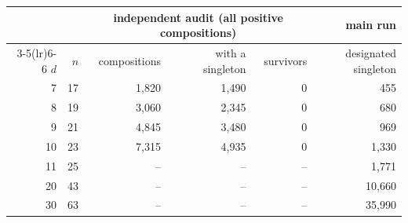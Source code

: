 \begin{tabular}{rrrrrr}
\toprule
 & & \multicolumn{3}{c}{independent audit (all positive compositions)} & main run \\
\cmidrule(lr){3-5}\cmidrule(lr){6-6}
$d$ & $n$ & compositions & with a singleton & survivors & designated singleton \\
\midrule
7 & 17 & 1{,}820 & 1{,}490 & 0 & 455 \\
8 & 19 & 3{,}060 & 2{,}345 & 0 & 680 \\
9 & 21 & 4{,}845 & 3{,}480 & 0 & 969 \\
10 & 23 & 7{,}315 & 4{,}935 & 0 & 1{,}330 \\
11 & 25 & -- & -- & -- & 1{,}771 \\
20 & 43 & -- & -- & -- & 10{,}660 \\
30 & 63 & -- & -- & -- & 35{,}990 \\
\bottomrule
\end{tabular}
